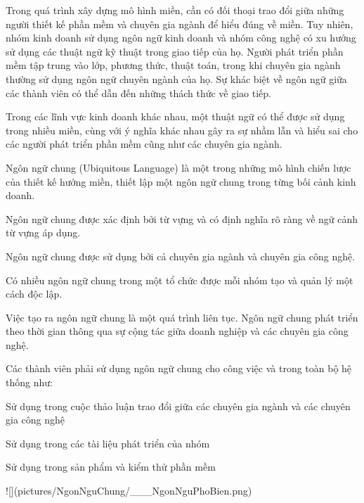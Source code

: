 
Trong quá trình xây dựng mô hình miền, cần có đối thoại trao đổi giữa những người thiết kế phần mềm và chuyên gia ngành để hiểu đúng về miền. Tuy nhiên, nhóm kinh doanh sử dụng ngôn ngữ kinh doanh và nhóm công nghệ có xu hướng sử dụng các thuật ngữ kỹ thuật trong giao tiếp của họ. Người phát triển phần mềm tập trung vào lớp, phương thức, thuật toán, trong khi chuyên gia ngành thường sử dụng ngôn ngữ chuyên ngành của họ. Sự khác biệt về ngôn ngữ giữa các thành viên có thể dẫn đến những thách thức về giao tiếp.

Trong các lĩnh vực kinh doanh khác nhau, một thuật ngữ có thể được sử dụng trong nhiều miền, cùng với ý nghĩa khác nhau gây ra sự nhầm lẫn và hiểu sai cho các người phát triển phần mềm cũng như các chuyên gia ngành.


Ngôn ngữ chung (Ubiquitous Language) là một trong những mô hình chiến lược của thiết kế hướng miền, thiết lập một ngôn ngữ chung trong từng bối cảnh kinh doanh.

Ngôn ngữ chung được xác định bởi từ vựng và có định nghĩa rõ ràng về ngữ cảnh từ vựng áp dụng.


Ngôn ngữ chung được sử dụng bởi cả chuyên gia ngành và chuyên gia công nghệ.

Có nhiều ngôn ngữ chung trong một tổ chức được mỗi nhóm tạo và quản lý một cách độc lập.

Việc tạo ra ngôn ngữ chung là một quá trình liên tục. Ngôn ngữ chung phát triển theo thời gian thông qua sự cộng tác giữa doanh nghiệp và các chuyên gia công nghệ.

Các thành viên phải sử dụng ngôn ngữ chung cho công việc và trong toàn bộ hệ thống như:

Sử dụng trong cuộc thảo luận trao đổi giữa các chuyên gia ngành và các chuyên gia công nghệ

Sử dụng trong các tài liệu phát triển của nhóm

Sử dụng trong sản phẩm và kiểm thử phần mềm

![](pictures/NgonNguChung/___NgonNguPhoBien.png)




